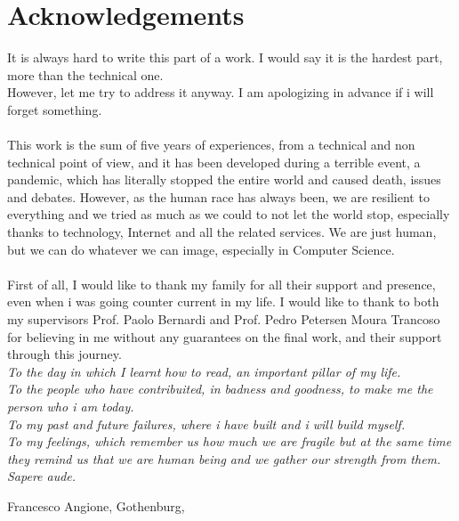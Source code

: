 \thispagestyle{plain_cover}			%
\section*{Acknowledgements}
 
It is always hard to write this part of a work. I would say it is the hardest part, more than the technical one.\\ 
However, let me try to address it anyway. I am apologizing in advance if i will forget something.\\\\
 
This work is the sum of five years of experiences, from a technical and non technical point of view, and it has been developed during a terrible event, a pandemic, which has literally stopped the entire world and caused death, issues and debates. However, as the human race has always been, we are resilient to everything and we tried as much as we could to not let the world stop, especially thanks to technology, Internet and all the related services.
We are just human, but we can do whatever we can image, especially in Computer Science.\\\\


First of all, I would like to thank my family for all their support and presence, even when i was going counter current in my life.
I would like to thank to both my supervisors Prof. Paolo Bernardi and Prof. Pedro Petersen Moura Trancoso for believing in me without any guarantees on the final work, and their support through this journey.\\

\textit{
To the day in which I learnt how to read, an important pillar of my life.\\
To the people who have contribuited, in badness and goodness, to make me the person who i am today.\\
To my past and future failures, where i have built and i will build myself.\\
To my feelings, which remember us how much we are fragile but at the same time they remind us that we are human being and we gather our strength from them.\\
Sapere aude.\\}

\vspace{1.5cm}
\hfill
Francesco Angione, Gothenburg, \monthname \space \the\year

\newpage				%
\thispagestyle{empty}
\mbox{}